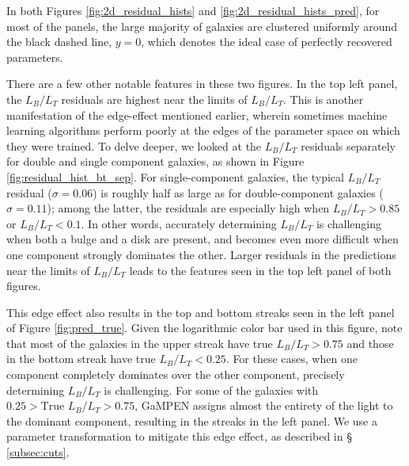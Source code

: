 \documentclass[twocolumn]{aastex63}
\newcommand\gampen{GaMPEN}
\begin{document}
\begin{CJK*}{UTF8}{gbsn}
In both Figures \ref{fig:2d_residual_hists} and \ref{fig:2d_residual_hists_pred}, for most of the panels, the large majority of galaxies are clustered uniformly around the black dashed line, $y = 0$, which denotes the ideal case of perfectly recovered parameters.%

There are a few other notable features in these two figures. In the top left panel, the $L_B/L_T$ residuals are highest near the limits of $L_B/L_T$. This is another manifestation of the edge-effect mentioned earlier, wherein sometimes machine learning algorithms perform poorly at the edges of the parameter space on which they were trained.  To delve deeper, we looked at the $L_B/L_T$ residuals separately for double and single component galaxies, as shown in Figure \ref{fig:residual_hist_bt_sep}. 
For single-component galaxies, the typical $L_B/L_T$ residual ($\sigma=0.06$) is roughly half as large as for double-component galaxies ($\sigma=0.11$);
among the latter, the residuals are especially high when $L_B/L_T > 0.85$ or $L_B/L_T < 0.1$. In other words, accurately determining $L_B/L_T$ is challenging when both a bulge and a disk are present, and becomes even more difficult when one component strongly dominates the other. %
Larger residuals in the predictions near the limits of $L_B/L_T$ leads to the features seen in the top left panel of both figures.

This edge effect also results in the top and bottom streaks seen in the left panel of Figure \ref{fig:pred_true}. Given the logarithmic  color bar used in this figure, note that most of the galaxies in the upper streak have true $L_B/L_T > 0.75$ and those in the bottom streak have true $L_B/L_T < 0.25$. For these cases, when one component completely dominates over the other component, precisely determining $L_B/L_T$ is challenging. For some of the galaxies with $0.25 > \mathrm{True}\,\,L_B/L_T > 0.75$, \gampen{} assigns almost the entirety of the light to the dominant component, resulting in the streaks in the left panel. We use a parameter transformation to mitigate this edge effect, as described in \S\,\ref{subsec:cuts}. 


\end{CJK*}
\end{document}
